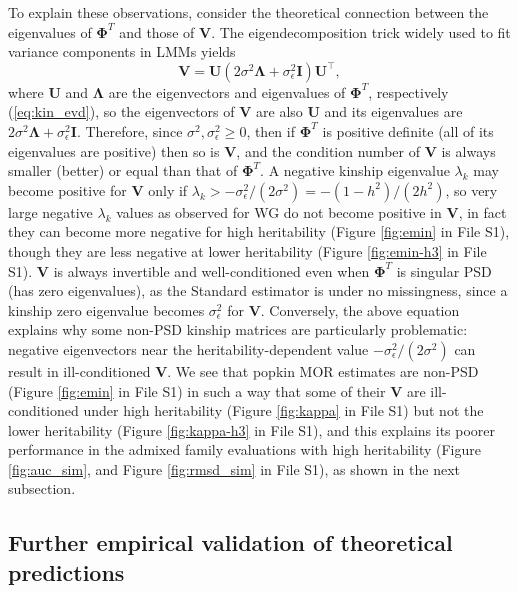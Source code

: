 \documentclass[9pt,twocolumn,twoside]{gsajnl}
\newcommand{\kinMat}[1][T]{\mathbf{\Phi}^{#1}}
\begin{document}
To explain these observations, consider the theoretical connection between the eigenvalues of $\kinMat$ and those of $\mathbf{V}$.
The eigendecomposition trick widely used to fit variance components in LMMs \citep{kang_efficient_2008, lippert_fast_2011, svishcheva_rapid_2012, zhou_genome-wide_2012, sul_population_2018} yields
$$
\mathbf{V} = \mathbf{U} \left( 2 \sigma^2 \mathbf{\Lambda} + \sigma^2_\epsilon \mathbf{I} \right) \mathbf{U}^\intercal,
$$
where $\mathbf{U}$ and $\mathbf{\Lambda}$ are the eigenvectors and eigenvalues of $\kinMat$, respectively (\cref{eq:kin_evd}),
so the eigenvectors of $\mathbf{V}$ are also $\mathbf{U}$ and its eigenvalues are $2 \sigma^2 \mathbf{\Lambda} + \sigma^2_\epsilon \mathbf{I}$.
Therefore, since $\sigma^2, \sigma^2_\epsilon \ge 0$, then if $\kinMat$ is positive definite (all of its eigenvalues are positive) then so is $\mathbf{V}$, and the condition number of $\mathbf{V}$ is always smaller (better) or equal than that of $\kinMat$.
A negative kinship eigenvalue $\lambda_k$ may become positive for $\mathbf{V}$ only if $\lambda_k  > -\sigma^2_\epsilon/(2\sigma^2) = -(1-h^2)/(2h^2)$, so very large negative $\lambda_k$ values as observed for WG do not become positive in $\mathbf{V}$, in fact they can become more negative for high heritability (Figure \ref*{fig:emin} in File S1), though they are less negative at lower heritability (Figure \ref*{fig:emin-h3} in File S1).
$\mathbf{V}$ is always invertible and well-conditioned even when $\kinMat$ is singular PSD (has zero eigenvalues), as the Standard estimator is under no missingness, since a kinship zero eigenvalue becomes $\sigma^2_\epsilon$ for $\mathbf{V}$.
Conversely, the above equation explains why some non-PSD kinship matrices are particularly problematic: negative eigenvectors near the heritability-dependent value $-\sigma^2_\epsilon/(2\sigma^2)$ can result in ill-conditioned $\mathbf{V}$.
We see that popkin MOR estimates are non-PSD (Figure \ref*{fig:emin} in File S1) in such a way that some of their $\mathbf{V}$ are ill-conditioned under high heritability (Figure \ref*{fig:kappa} in File S1) but not the lower heritability (Figure \ref*{fig:kappa-h3} in File S1), and this explains its poorer performance in the admixed family evaluations with high heritability (Figure \ref{fig:auc_sim}, and Figure \ref*{fig:rmsd_sim} in File S1), as shown in the next subsection.

\subsection{Further empirical validation of theoretical predictions}
\end{document}
